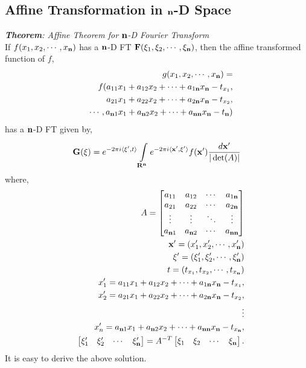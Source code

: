 \documentclass{UCF_ETD}
\begin{document}
\subsection{Affine Transformation in ${\bf n}$-D Space}
\emph{{\bf Theorem}: Affine Theorem for ${\bf n}$-D Fourier Transform}\\
\indent If $f(x_1,x_2,\cdots,x_{\bf n})$ has a ${\bf n}$-D FT ${\bf{F}}(\xi_1, \xi_2, \cdots , \xi_{\bf n})$, then the affine transformed function of $f$, 
\begin{eqnarray*}
&& g(x_1,x_2,\cdots,x_{\bf n}) = \\
&&  f(a_{11}x_1 + a_{12}x_2 + \cdots+ a_{1{\bf n}}x_{\bf n} -t_{x_1}, \\
&&  a_{21}x_1 + a_{22}x_2 +\cdots + a_{2{\bf n}}x_{\bf n} -t_{x_2}, \\
&&  \cdots,a_{{\bf n}1}x_1 + a_{{\bf n}2}x_2 +\cdots+ a_{{\bf n}{\bf n}}x_{\bf n} -t_{\bf n} )
\end{eqnarray*}
has a ${\bf n}$-D FT given by,
\begin{eqnarray} \label{nDAffineTheorem}
{\bf G}(\xi)= e^{-2\pi i  \langle {\bf \xi}', t \rangle  } \int\limits_{{\bf R^{\bf n}}}^{} e^{-2\pi i \langle {\bf x'},{\bf \xi'} \rangle  } f({\bf x'}) \frac{d{\bf x}'}{|\det(A)|}
\end{eqnarray}
where, 
\begin{eqnarray*}
&& A = \begin{bmatrix}     
      a_{11} & a_{12}& \cdots & a_{1{\bf n}} \\
      a_{21} & a_{22} & \cdots & a_{2{\bf n}} \\
      \vdots & \vdots & \ddots & \vdots\\
      a_{{\bf n}1} & a_{{\bf n}2} & \cdots & a_{{\bf n}{\bf n}} \\
  \end{bmatrix} \\
&& {\bf x'} = (x'_1,x'_2,\cdots , x'_{\bf n})\\
&& {\bf {\xi'} } = (\xi'_1, \xi'_2, \cdots , \xi'_{\bf n})\\
&& t = (t_{x_1},t_{x_2},\cdots,t_{x_{\bf n}})\\
&& x'_1 = a_{11}x_1 + a_{12}x_2 + \cdots + a_{1{\bf n}}x_{\bf n} -t_{x_1},\\
&& x'_2 = a_{21}x_1 + a_{22}x_2 + \cdots + a_{2{\bf n}}x_{\bf n} -t_{x_2},\\
&& \vdots\\
&& x'_n = a_{{\bf n}1}x_1 + a_{{\bf n}2}x_2 + \cdots + a_{{\bf n}{\bf n}}x_{\bf n} -t_{x_{\bf n}},\\
&&\begin{bmatrix} \xi'_1& \xi'_2& \cdots & \xi'_{\bf n} \end{bmatrix} =  A^{-T} \begin{bmatrix} \xi_1& \xi_2& \cdots & \xi_{\bf n} \end{bmatrix}.
\end{eqnarray*}
It is easy to derive the above solution. 
\end{document}
